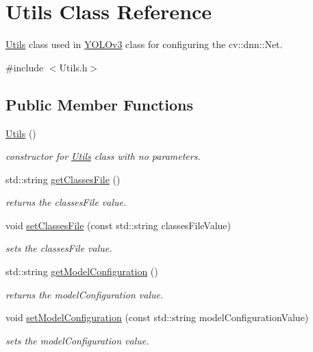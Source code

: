 \hypertarget{classUtils}{}\section{Utils Class Reference}
\label{classUtils}


\hyperlink{classUtils}{Utils} class used in \hyperlink{classYOLOv3}{Y\+O\+L\+Ov3} class for configuring the cv\+::dnn\+::\+Net.  




{\ttfamily \#include $<$Utils.\+h$>$}

\subsection*{Public Member Functions}
\begin{DoxyCompactItemize}
\item 
\hyperlink{classUtils_a452e78692c87ed5c7c993b6c6ac4981a}{Utils} ()
\begin{DoxyCompactList}\small\item\em constructor for \hyperlink{classUtils}{Utils} class with no parameters. \end{DoxyCompactList}\item 
std\+::string \hyperlink{classUtils_a1c5e4a32315e780b6b29c02a28bc869a}{get\+Classes\+File} ()
\begin{DoxyCompactList}\small\item\em returns the classes\+File value. \end{DoxyCompactList}\item 
void \hyperlink{classUtils_aaa5247cba2b0914b353a1ecd7c41b071}{set\+Classes\+File} (const std\+::string classes\+File\+Value)
\begin{DoxyCompactList}\small\item\em sets the classes\+File value. \end{DoxyCompactList}\item 
std\+::string \hyperlink{classUtils_ad2bb2f454cbe7d4d3434f134b12144f0}{get\+Model\+Configuration} ()
\begin{DoxyCompactList}\small\item\em returns the model\+Configuration value. \end{DoxyCompactList}\item 
void \hyperlink{classUtils_a9b7fb4c851538e0c28fda156a15fa747}{set\+Model\+Configuration} (const std\+::string model\+Configuration\+Value)
\begin{DoxyCompactList}\small\item\em sets the model\+Configuration value. \end{DoxyCompactList}\item 

\end{DoxyCompactItemize}

